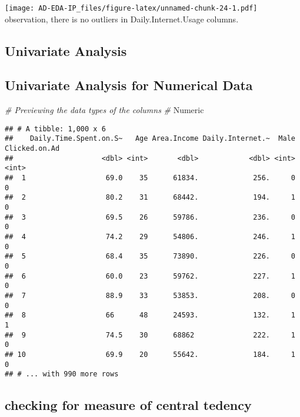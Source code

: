 \documentclass[
]{article}
\newenvironment{Shaded}{\begin{snugshade}}{\end{snugshade}}
\newcommand{\CommentTok}[1]{\textcolor[rgb]{0.56,0.35,0.01}{\textit{#1}}}
\newcommand{\NormalTok}[1]{#1}
\begin{document}
\texttt{[image: AD-EDA-IP\_files/figure-latex/unnamed-chunk-24-1.pdf]}
observation, there is no outliers in Daily.Internet.Usage columns.

\hypertarget{univariate-analysis}{%
\subsection{Univariate Analysis}\label{univariate-analysis}}

\hypertarget{univariate-analysis-for-numerical-data}{%
\subsection{Univariate Analysis for Numerical
Data}\label{univariate-analysis-for-numerical-data}}

\begin{Shaded}
\begin{Highlighting}[]
\CommentTok{\# Previewing the data types of the columns}
\CommentTok{\#}
\NormalTok{Numeric}
\end{Highlighting}
\end{Shaded}

\begin{verbatim}
## # A tibble: 1,000 x 6
##    Daily.Time.Spent.on.S~   Age Area.Income Daily.Internet.~  Male Clicked.on.Ad
##                     <dbl> <int>       <dbl>            <dbl> <int>         <int>
##  1                   69.0    35      61834.             256.     0             0
##  2                   80.2    31      68442.             194.     1             0
##  3                   69.5    26      59786.             236.     0             0
##  4                   74.2    29      54806.             246.     1             0
##  5                   68.4    35      73890.             226.     0             0
##  6                   60.0    23      59762.             227.     1             0
##  7                   88.9    33      53853.             208.     0             0
##  8                   66      48      24593.             132.     1             1
##  9                   74.5    30      68862              222.     1             0
## 10                   69.9    20      55642.             184.     1             0
## # ... with 990 more rows
\end{verbatim}

\hypertarget{checking-for-measure-of-central-tedency}{%
\subsection{checking for measure of central
tedency}\label{checking-for-measure-of-central-tedency}}
\end{document}

